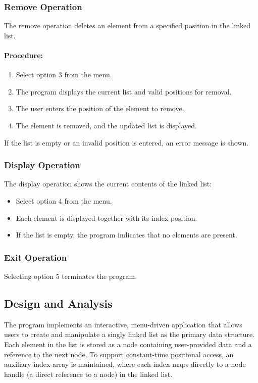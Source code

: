 \documentclass[12pt]{article}
\begin{document}
\subsubsection{Remove Operation}
The remove operation deletes an element from a specified position in the linked list.

\paragraph{Procedure:}
\begin{enumerate}
    \item Select option 3 from the menu.
    \item The program displays the current list and valid positions for removal.
    \item The user enters the position of the element to remove.
    \item The element is removed, and the updated list is displayed.
\end{enumerate}
If the list is empty or an invalid position is entered, an error message is shown.

\subsubsection{Display Operation}
The display operation shows the current contents of the linked list:
\begin{itemize}
    \item Select option 4 from the menu.
    \item Each element is displayed together with its index position.
    \item If the list is empty, the program indicates that no elements are present.
\end{itemize}

\subsubsection{Exit Operation}
Selecting option 5 terminates the program.

\subsection{Design and Analysis}

The program implements an interactive, menu-driven application that allows users to create and manipulate a singly linked list as the primary data structure. Each element in the list is stored as a node containing user-provided data and a reference to the next node. To support constant-time positional access, an auxiliary index array is maintained, where each index maps directly to a node handle (a direct reference to a node) in the linked list.\\
\end{document}
